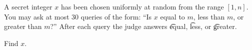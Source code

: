 A secret integer $x$ has been chosen uniformly at random from the range $[1, n]$.
You may ask at most $30$ queries of the form: ``Is $x$ equal to $m$, less than $m$, or greater than $m$?''
After each query the judge answers \t{equal}, \t{less}, or \t{greater}.

Find $x$.
